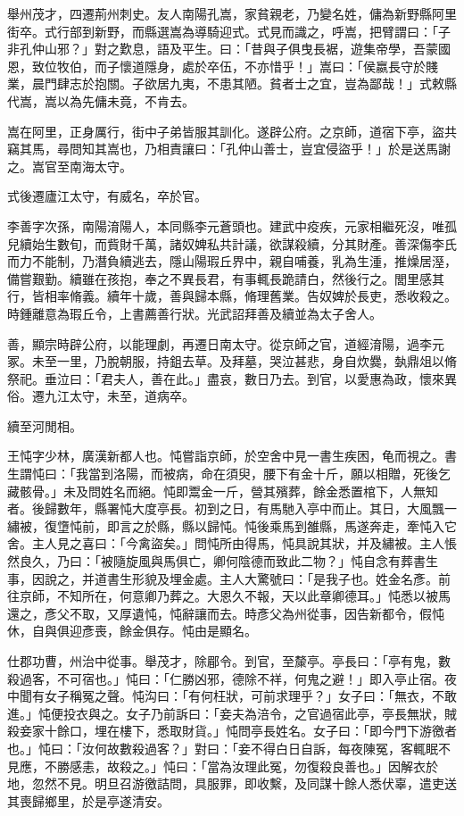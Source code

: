 \begin{pinyinscope}
舉州茂才，四遷荊州刺史。友人南陽孔嵩，家貧親老，乃變名姓，傭為新野縣阿里街卒。式行部到新野，而縣選嵩為導騎迎式。式見而識之，呼嵩，把臂謂曰：「子非孔仲山邪？」對之歎息，語及平生。曰：「昔與子俱曳長裾，遊集帝學，吾蒙國恩，致位牧伯，而子懷道隱身，處於卒伍，不亦惜乎！」嵩曰：「侯嬴長守於賤業，晨門肆志於抱關。子欲居九夷，不患其陋。貧者士之宜，豈為鄙哉！」式敕縣代嵩，嵩以為先傭未竟，不肯去。

嵩在阿里，正身厲行，街中子弟皆服其訓化。遂辟公府。之京師，道宿下亭，盜共竊其馬，尋問知其嵩也，乃相責讓曰：「孔仲山善士，豈宜侵盜乎！」於是送馬謝之。嵩官至南海太守。

式後遷廬江太守，有威名，卒於官。

李善字次孫，南陽淯陽人，本同縣李元蒼頭也。建武中疫疾，元家相繼死沒，唯孤兒續始生數旬，而貲財千萬，諸奴婢私共計議，欲謀殺續，分其財產。善深傷李氏而力不能制，乃潛負續逃去，隱山陽瑕丘界中，親自哺養，乳為生湩，推燥居溼，備嘗艱勤。續雖在孩抱，奉之不異長君，有事輒長跪請白，然後行之。閭里感其行，皆相率脩義。續年十歲，善與歸本縣，脩理舊業。告奴婢於長吏，悉收殺之。時鍾離意為瑕丘令，上書薦善行狀。光武詔拜善及續並為太子舍人。

善，顯宗時辟公府，以能理劇，再遷日南太守。從京師之官，道經淯陽，過李元冢。未至一里，乃脫朝服，持鉏去草。及拜墓，哭泣甚悲，身自炊爨，埶鼎俎以脩祭祀。垂泣曰：「君夫人，善在此。」盡哀，數日乃去。到官，以愛惠為政，懷來異俗。遷九江太守，未至，道病卒。

續至河閒相。

王忳字少林，廣漢新都人也。忳嘗詣京師，於空舍中見一書生疾困，龟而視之。書生謂忳曰：「我當到洛陽，而被病，命在須臾，腰下有金十斤，願以相贈，死後乞藏骸骨。」未及問姓名而絕。忳即鬻金一斤，營其殯葬，餘金悉置棺下，人無知者。後歸數年，縣署忳大度亭長。初到之日，有馬馳入亭中而止。其日，大風飄一繡被，復墯忳前，即言之於縣，縣以歸忳。忳後乘馬到雒縣，馬遂奔走，牽忳入它舍。主人見之喜曰：「今禽盜矣。」問忳所由得馬，忳具說其狀，并及繡被。主人悵然良久，乃曰：「被隨旋風與馬俱亡，卿何陰德而致此二物？」忳自念有葬書生事，因說之，并道書生形貌及埋金處。主人大驚號曰：「是我子也。姓金名彥。前往京師，不知所在，何意卿乃葬之。大恩久不報，天以此章卿德耳。」忳悉以被馬還之，彥父不取，又厚遺忳，忳辭讓而去。時彥父為州從事，因告新都令，假忳休，自與俱迎彥喪，餘金俱存。忳由是顯名。

仕郡功曹，州治中從事。舉茂才，除郿令。到官，至斄亭。亭長曰：「亭有鬼，數殺過客，不可宿也。」忳曰：「仁勝凶邪，德除不祥，何鬼之避！」即入亭止宿。夜中聞有女子稱冤之聲。忳沟曰：「有何枉狀，可前求理乎？」女子曰：「無衣，不敢進。」忳便投衣與之。女子乃前訴曰：「妾夫為涪令，之官過宿此亭，亭長無狀，賊殺妾家十餘口，埋在樓下，悉取財貨。」忳問亭長姓名。女子曰：「即今門下游徼者也。」忳曰：「汝何故數殺過客？」對曰：「妾不得白日自訴，每夜陳冤，客輒眠不見應，不勝感恚，故殺之。」忳曰：「當為汝理此冤，勿復殺良善也。」因解衣於地，忽然不見。明旦召游徼詰問，具服罪，即收繫，及同謀十餘人悉伏辜，遣吏送其喪歸鄉里，於是亭遂清安。


\end{pinyinscope}

